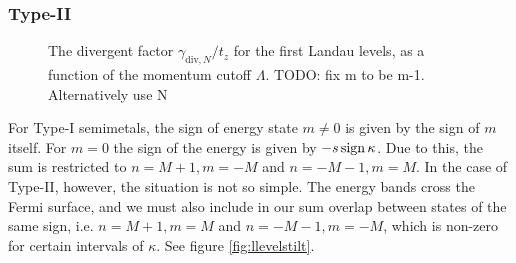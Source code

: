 \subsubsection{Type-II}


\begin{figure}[hp]
  \centering
  \caption{The divergent factor \( \gamma_{\text{div}, N} / t_{z} \) for the first Landau levels, as a function of the momentum cutoff \( \Lambda \).
    TODO: fix m to be m-1. Alternatively use N}
  \label{fig:divergent-factor}
\end{figure}
For Type-I semimetals, the sign of energy state \( m \neq 0 \) is given by the sign of \( m \) itself.
For \( m = 0 \) the sign of the energy is given by \( -s \operatorname{sign}{\kappa } \).
Due to this, the sum is restricted to \( n=M+1, m=-M \) and \( n=-M-1, m=M \).
In the case of Type-II, however, the situation is not so simple.
The energy bands cross the Fermi surface, and we must also include in our sum overlap between states of the same sign, i.e. \( n=M+1, m=M \) and \( n=-M-1, m=-M \), which is non-zero for certain intervals of \( \kappa  \).
See figure \ref{fig:llevelstilt}.

